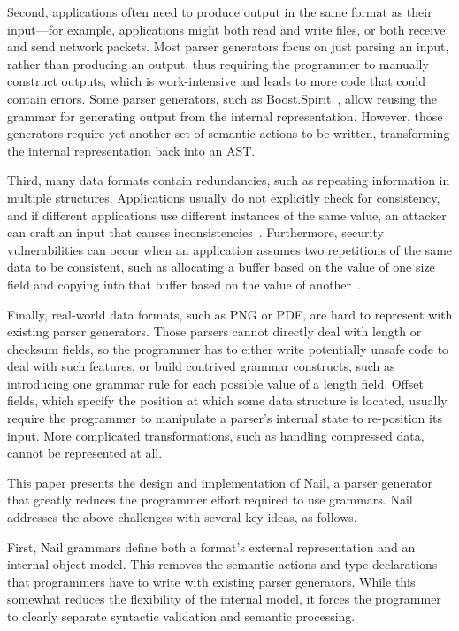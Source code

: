 Second,  applications often need to produce output in the same
format as their input---for example, applications might both
read and write files, or both receive and send network packets.
Most parser generators focus on just parsing an input, rather
than producing an output, thus requiring the programmer to manually
construct outputs, which is work-intensive and leads to
more code that could contain errors.
Some parser generators, such as
Boost.Spirit~\cite{boost-spirit},
allow reusing the grammar for generating output from the internal
representation.  However, those generators require yet another set of
semantic actions to be written, transforming the internal representation
back into an AST\@.

Third, many data formats contain redundancies, such as repeating
information in multiple structures.  Applications usually do not
explicitly check for consistency, and if different applications use
different instances of the same value, an attacker can craft an input that
causes inconsistencies~\cite{evaders6}.  Furthermore, security
vulnerabilities can occur when an application assumes two repetitions
of the same data to be consistent, such as allocating a buffer based on
the value of one size field and copying into that buffer based on the
value of another~\cite{python-bug:20078}.

Finally, real-world data formats, such as PNG or PDF, are hard to
represent with existing parser generators.  Those parsers cannot directly
deal with length or checksum fields, so the programmer has to
either write potentially unsafe code to deal with such features, or build
contrived grammar constructs, such as introducing one grammar rule for
each possible value of a length field.  Offset fields, which specify
the position at which some data structure is located, usually require
the programmer to manipulate a parser's internal state to re-position
its input.  More complicated transformations, such as handling compressed
data, cannot be represented at all.



This paper presents the design and implementation of Nail, a parser generator that greatly reduces
the programmer effort required to use grammars. Nail addresses the above challenges with
several key ideas, as follows.

First, Nail grammars define both a format's external representation and an internal object model.
This removes the semantic actions and type declarations that programmers have to write with existing
parser generators. While this somewhat reduces the flexibility of the internal model, it forces the programmer
to clearly separate syntactic validation and semantic processing.

